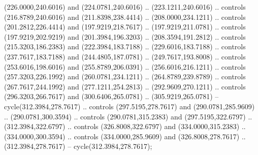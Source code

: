 {{\begin{scope}[y=-0.80pt,x=0.80pt,scale=0.038,xshift=-135pt,yshift=355pt]
        (226.0000,240.6016) and (224.0781,240.6016) .. (223.1211,240.6016) .. controls
        (216.8789,240.6016) and (211.8398,238.4414) .. (208.0000,234.1211) .. controls
        (201.2812,226.4414) and (197.9219,218.7617) .. (197.9219,211.0781) .. controls
        (197.9219,202.9219) and (201.3984,196.3203) .. (208.3594,191.2812) .. controls
        (215.3203,186.2383) and (222.3984,183.7188) .. (229.6016,183.7188) .. controls
        (237.7617,183.7188) and (244.4805,187.0781) .. (249.7617,193.8008) .. controls
        (253.6016,198.6016) and (255.8789,206.0391) .. (256.6016,216.1211) .. controls
        (257.3203,226.1992) and (260.0781,234.1211) .. (264.8789,239.8789) .. controls
        (267.7617,244.1992) and (277.1211,254.2813) .. (292.9609,270.1211) .. controls
        (296.3203,266.7617) and (300.6406,265.0781) .. (305.9219,265.0781) --
        cycle(312.3984,278.7617) .. controls (297.5195,278.7617) and
        (290.0781,285.9609) .. (290.0781,300.3594) .. controls (290.0781,315.2383) and
        (297.5195,322.6797) .. (312.3984,322.6797) .. controls (326.8008,322.6797) and
        (334.0000,315.2383) .. (334.0000,300.3594) .. controls (334.0000,285.9609) and
        (326.8008,278.7617) .. (312.3984,278.7617) -- cycle(312.3984,278.7617);
    \end{scope}
  }
}